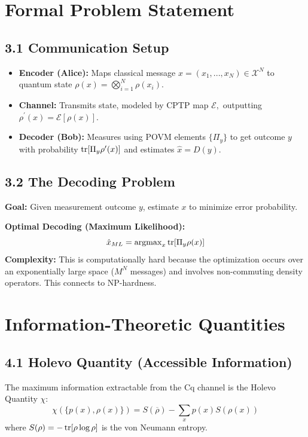 \documentclass[12pt, a4paper]{article}
\begin{document}
\section{Formal Problem Statement}

\subsection{3.1 Communication Setup}
\begin{itemize}
    \item \textbf{Encoder (Alice):} Maps classical message $x=(x_{1},...,x_{N})\in\mathcal{X}^{N}$ to quantum state $\rho(x)=\bigotimes_{i=1}^{N}\rho(x_{i})$.
    \item \textbf{Channel:} Transmits state, modeled by CPTP map $\mathcal{E},$ outputting $\rho^{\prime}(x)=\mathcal{E}[\rho(x)]$.
    \item \textbf{Decoder (Bob):} Measures using POVM elements $\{\Pi_{y}\}$ to get outcome $y$ with probability $\tr[\Pi_{y}\rho^{\prime}(x)]$ and estimates $\hat{x}=D(y)$.
\end{itemize}

\subsection{3.2 The Decoding Problem}
\textbf{Goal:} Given measurement outcome $y$, estimate $x$ to minimize error probability.

\textbf{Optimal Decoding (Maximum Likelihood):}
\begin{equation}
\hat{x}_{ML} = \operatorname{argmax}_{x} \tr[\Pi_{y}\rho(x)]
\end{equation}
\textbf{Complexity:} This is computationally hard because the optimization occurs over an exponentially large space ($M^{N}$ messages) and involves non-commuting density operators. This connects to NP-hardness.

\section{Information-Theoretic Quantities}

\subsection{4.1 Holevo Quantity (Accessible Information)}
The maximum information extractable from the Cq channel is the Holevo Quantity $\chi$:
\begin{equation}
\chi(\{p(x),\rho(x)\}) = S(\overline{\rho}) - \sum_{x}p(x)S(\rho(x))
\end{equation}
where $S(\rho)=-\tr[\rho \log \rho]$ is the von Neumann entropy.
\end{document}
